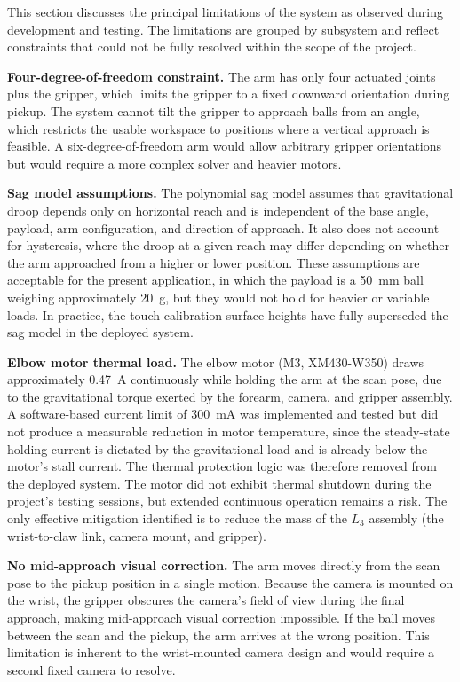 
This section discusses the principal limitations of the system
as observed during development and testing. The limitations are
grouped by subsystem and reflect constraints that could not be
fully resolved within the scope of the project.


\textbf{Four-degree-of-freedom constraint.} The arm has only
four actuated joints plus the gripper, which limits the gripper
to a fixed downward orientation during pickup. The system
cannot tilt the gripper to approach balls from an angle, which
restricts the usable workspace to positions where a vertical
approach is feasible. A six-degree-of-freedom arm would allow
arbitrary gripper orientations but would require a more complex
solver and heavier motors.

\textbf{Sag model assumptions.} The polynomial sag model
assumes that gravitational droop depends only on horizontal
reach and is independent of the base angle, payload, arm
configuration, and direction of approach. It also does not
account for hysteresis, where the droop at a given reach may
differ depending on whether the arm approached from a higher
or lower position. These assumptions are acceptable for the
present application, in which the payload is a 50~mm ball
weighing approximately 20~g, but they would not hold for
heavier or variable loads. In practice, the touch calibration
surface heights have fully superseded the sag model in the
deployed system.

\textbf{Elbow motor thermal load.} The elbow motor
(M3, XM430-W350) draws approximately 0.47~A continuously
while holding the arm at the scan pose, due to the
gravitational torque exerted by the forearm, camera, and
gripper assembly. A software-based current limit of 300~mA
was implemented and tested but did not produce a measurable
reduction in motor temperature, since the steady-state holding
current is dictated by the gravitational load and is already
below the motor's stall current. The thermal protection logic
was therefore removed from the deployed system. The motor did
not exhibit thermal shutdown during the project's testing
sessions, but extended continuous operation remains a risk.
The only effective mitigation identified is to reduce the mass
of the $L_3$ assembly (the wrist-to-claw link, camera mount,
and gripper).

\textbf{No mid-approach visual correction.} The arm moves
directly from the scan pose to the pickup position in a single
motion. Because the camera is mounted on the wrist, the
gripper obscures the camera's field of view during the final
approach, making mid-approach visual correction impossible.
If the ball moves between the scan and the pickup, the arm
arrives at the wrong position. This limitation is inherent to
the wrist-mounted camera design and would require a second
fixed camera to resolve.

